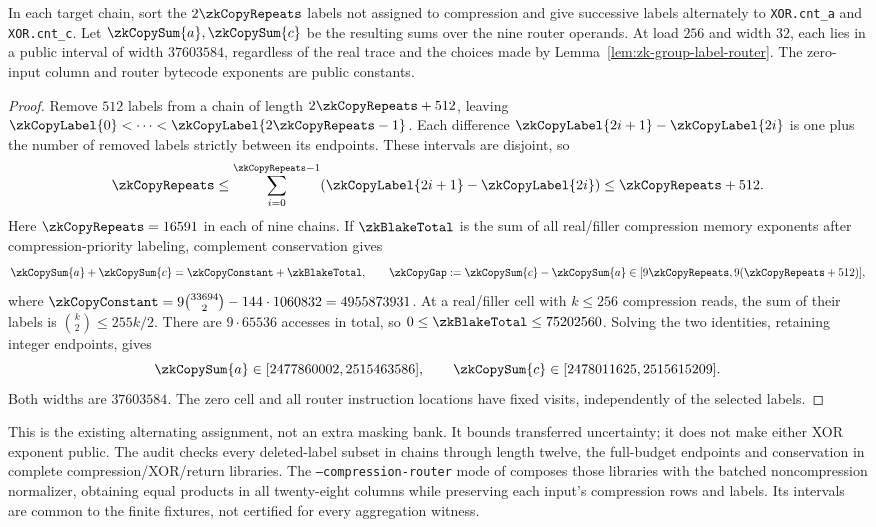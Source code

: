 \begin{lemma}\label{lem:zk-copy-complement-bound}
In each target chain, sort the $2\zkCopyRepeats$ labels not assigned to compression and give successive labels alternately to \texttt{XOR.cnt\_a} and \texttt{XOR.cnt\_c}. Let $\zkCopySum{a},\zkCopySum{c}$ be the resulting sums over the nine router operands. At load $256$ and width $32$, each lies in a public interval of width $37603584$, regardless of the real trace and the choices made by Lemma~\ref{lem:zk-group-label-router}. The zero-input column and router bytecode exponents are public constants.
\end{lemma}
\begin{proof}
Remove $512$ labels from a chain of length $2\zkCopyRepeats+512$, leaving $\zkCopyLabel{0}<\cdots<\zkCopyLabel{2\zkCopyRepeats-1}$. Each difference $\zkCopyLabel{2i+1}-\zkCopyLabel{2i}$ is one plus the number of removed labels strictly between its endpoints. These intervals are disjoint, so
\[
 \zkCopyRepeats\le\sum_{i=0}^{\zkCopyRepeats-1}(\zkCopyLabel{2i+1}-\zkCopyLabel{2i})\le\zkCopyRepeats+512.
\]
Here $\zkCopyRepeats=16591$ in each of nine chains. If $\zkBlakeTotal$ is the sum of all real/filler compression memory exponents after compression-priority labeling, complement conservation gives
\[
 \zkCopySum{a}+\zkCopySum{c}=\zkCopyConstant+\zkBlakeTotal,
 \qquad \zkCopyGap:=\zkCopySum{c}-\zkCopySum{a}\in[9\zkCopyRepeats,9(\zkCopyRepeats+512)],
\]
where $\zkCopyConstant=9\binom{33694}{2}-144\cdot1060832=4955873931$. At a real/filler cell with $k\le256$ compression reads, the sum of their labels is $\binom{k}{2}\le255k/2$. There are $9\cdot65536$ accesses in total, so $0\le\zkBlakeTotal\le75202560$. Solving the two identities, retaining integer endpoints, gives
\[
 \zkCopySum{a}\in[2477860002,2515463586],
 \qquad
 \zkCopySum{c}\in[2478011625,2515615209].
\]
Both widths are $37603584$. The zero cell and all router instruction locations have fixed visits, independently of the selected labels.
\end{proof}

This is the existing alternating assignment, not an extra masking bank. It bounds transferred uncertainty; it does not make either XOR exponent public. The audit checks every deleted-label subset in chains through length twelve, the full-budget endpoints and conservation in complete compression/XOR/return libraries. The \texttt{--compression-router} mode of  composes those libraries with the batched noncompression normalizer, obtaining equal products in all twenty-eight columns while preserving each input's compression rows and labels. Its intervals are common to the finite fixtures, not certified for every aggregation witness.

